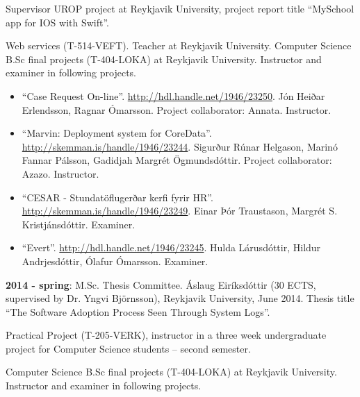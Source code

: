 Supervisor UROP project at Reykjavik University, project report title
``MySchool app for IOS with Swift''.

Web services (T-514-VEFT). Teacher at Reykjavik University. Computer Science
B.Sc final projects (T-404-LOKA) at Reykjavik University. Instructor and
examiner in following projects.

\begin{itemize}
\item ``Case Request On-line''. \url{http://hdl.handle.net/1946/23250}. Jón
    Heiðar Erlendsson, Ragnar Ómarsson. Project collaborator: Annata.
        Instructor.

\item ``Marvin: Deployment system for CoreData''.
    \url{http://skemman.is/handle/1946/23244}. Sigurður Rúnar Helgason, Marinó
        Fannar Pálsson, Gadidjah Margrét Ögmundsdóttir. Project collaborator:
        Azazo. Instructor.

\item ``CESAR - Stundatöflugerðar kerfi fyrir HR''.
    \url{http://skemman.is/handle/1946/23249}. Einar Þór Traustason, Margrét S.
        Kristjánsdóttir. Examiner. 

\item ``Evert''. \url{http://hdl.handle.net/1946/23245}. Hulda Lárusdóttir,
    Hildur Andrjesdóttir, Ólafur Ómarsson. Examiner.
\end{itemize}

\textbf{2014 - spring}:
M.Sc. Thesis Committee. Áslaug Eiríksdóttir (30 ECTS, supervised by Dr. Yngvi
Björnsson), Reykjavik University, June 2014. Thesis title ``The Software
Adoption Process Seen Through System Logs''.

Practical Project (T-205-VERK), instructor in a three week undergraduate
project for Computer Science students -- second semester.

Computer Science B.Sc final projects (T-404-LOKA) at Reykjavik University.
Instructor and examiner in following projects.


